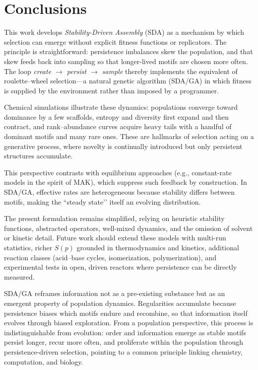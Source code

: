 \documentclass[life,article,submit,pdftex,moreauthors]{Definitions/mdpi}
\begin{document}
\section{Conclusions}

This work develops \textit{Stability-Driven Assembly} (SDA) as a mechanism by which selection can emerge without explicit fitness functions or replicators. The principle is straightforward: persistence imbalances skew the population, and that skew feeds back into sampling so that longer-lived motifs are chosen more often. The loop \emph{create $\rightarrow$ persist $\rightarrow$ sample} thereby implements the equivalent of roulette–wheel selection—a natural genetic algorithm (SDA/GA) in which fitness is supplied by the environment rather than imposed by a programmer.  

Chemical simulations illustrate these dynamics: populations converge toward dominance by a few scaffolds, entropy and diversity first expand and then contract, and rank–abundance curves acquire heavy tails with a handful of dominant motifs and many rare ones. These are hallmarks of selection acting on a generative process, where novelty is continually introduced but only persistent structures accumulate.  

This perspective contrasts with equilibrium approaches (e.g., constant-rate models in the spirit of MAK), which suppress such feedback by construction. In SDA/GA, effective rates are heterogeneous because stability differs between motifs, making the ``steady state’’ itself an evolving distribution.  

The present formulation remains simplified, relying on heuristic stability functions, abstracted operators, well-mixed dynamics, and the omission of solvent or kinetic detail. Future work should extend these models with multi-run statistics, richer $S(p)$ grounded in thermodynamics and kinetics, additional reaction classes (acid–base cycles, isomerization, polymerization), and experimental tests in open, driven reactors where persistence can be directly measured.  

SDA/GA reframes information not as a pre-existing substance but as an emergent 
property of population dynamics. Regularities accumulate because persistence 
biases which motifs endure and recombine, so that information itself evolves 
through biased exploration. From a population perspective, this process is 
indistinguishable from evolution: order and information emerge as stable 
motifs persist longer, recur more often, and proliferate within the population 
through persistence-driven selection, pointing to a common principle linking 
chemistry, computation, and biology.
\end{document}
